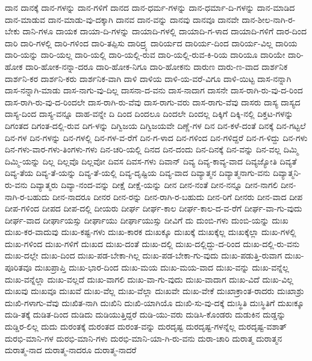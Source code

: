 {ದಾನ
ದಾನಕ್ಕೆ
ದಾನ-ಗಳನ್ನು
ದಾನ-ಗಳಿಗೆ
ದಾನದ
ದಾನ-ಧರ್ಮ-ಗಳನ್ನು
ದಾನ-ಧರ್ಮಾ-ದಿ-ಗಳನ್ನು
ದಾನ-ಮಾಡಿದ
ದಾನ-ಮಾಡುವ
ದಾನ-ಮಾಡು-ವು-ದಕ್ಕಾಗಿ
ದಾನವ
ದಾನ-ವನ್ನು
ದಾನವು
ದಾನವೂ
ದಾನವೇ
ದಾನ-ಶೀಲ-ನಾಗಿ-ರ-ಬೇಕು
ದಾನಿ-ಗಳೂ
ದಾಯಕ
ದಾಯಾ-ದಿ-ಗಳನ್ನು
ದಾಯಾದಿ-ಗಳಲ್ಲಿ
ದಾಯಾದಿ-ಗ-ಳಾದ
ದಾಯಾದಿ-ಗಳಿಗೆ
ದಾರ-ದಿಂದ
ದಾರಿ
ದಾರಿ-ಗಳಲ್ಲಿ
ದಾರಿ-ಗಳಿಂದ
ದಾರಿ-ತಪ್ಪಿಸು
ದಾರಿದ್ರ್ಯ
ದಾರಿರ್ಯದ
ದಾರಿರ್ಯ-ದಿಂದ
ದಾರಿರ್ಯ-ವಿಲ್ಲ
ದಾರಿಯ
ದಾರಿ-ಯನ್ನು
ದಾರಿ-ಯಲ್ಲ
ದಾರಿ-ಯಲ್ಲಿ
ದಾರಿ-ಯಲ್ಲಿ-ರುವ
ದಾರಿ-ಯಲ್ಲಿ-ರುವ-ಕಿ-ರಿಯ
ದಾರಿಯೂ
ದಾರಿಯೇ
ದಾರಿ-ಹೋಕ
ದಾರಿ-ಹೋಕ-ನನ್ನಾ-ದರೂ
ದಾರಿ-ಹೋಕ-ನಿಗೂ
ದಾರಿ-ಹೋಕನು
ದಾರುಣ
ದಾರು-ಣ-ವಾದ
ದಾರ್ಶನಿಕ
ದಾರ್ಶನಿ-ಕರ
ದಾರ್ಶನಿ-ಕರು
ದಾರ್ಶನಿಕ-ವಾಗಿ
ದಾಳಿ
ದಾಳಿಯ
ದಾಳಿ-ಯ-ವರೆ-ವಿಗೂ
ದಾಳಿ-ಯಿಟ್ಟ
ದಾಸ-ನನ್ನಾಗಿ
ದಾಸ-ನನ್ನಾಗಿ-ಮಾಡು
ದಾಸ-ನಾಗು-ವು-ದಿಲ್ಲ
ದಾಸನಾ-ದ-ವನು
ದಾಸ-ನಾದಾಗ
ದಾಸನೇ
ದಾಸ-ರಾಗಿ-ರು-ವು-ದ-ರಿಂದ
ದಾಸ-ರಾಗಿ-ರು-ವು-ದ-ರಿಂದಲೇ
ದಾಸ-ರಾಗಿ-ರು-ವೆವು
ದಾಸ-ರಾಗು-ವರು
ದಾಸ-ರಾಗು-ವೆವು
ದಾಸರು
ದಾಸ್ಯ
ದಾಸ್ಯದ
ದಾಸ್ಯ-ದಿಂದ
ದಾಸ್ಯ-ವನ್ನೂ
ದಾಹ-ವನ್ನೇ
ದಿ
ದಿಂದ
ದಿಂದಲೂ
ದಿಂದಲೇ
ದಿಂದಲ್ಲ
ದಿಕ್ಕಿಗೆ
ದಿಕ್ಕಿ-ನಲ್ಲಿ
ದಿಕ್ತಟ-ಗಳನ್ನು
ದಿಗಂತದ
ದಿಗಂತ-ದಲ್ಲಿ-ರುವ
ದಿಗ-ಳನ್ನು
ದಿಗ್ವಿಜಯ
ದಿಗ್ವಿಜಯವೇ
ದಿಣ್ಣೆ-ಗಳ
ದಿನ
ದಿನ-ಕಳೆ-ದಂತೆ
ದಿನಕ್ಕೆ
ದಿನ-ಗಟ್ಟಲೆ
ದಿನ-ಗಳ
ದಿನ-ಗಳನ್ನು
ದಿನ-ಗಳಲ್ಲಿ
ದಿನ-ಗಳ-ವ-ರೆಗೆ
ದಿನ-ಗ-ಳಾದ
ದಿನ-ಗಳಿಂದ
ದಿನ-ಗಳಿದ್ದರೆ
ದಿನ-ಗ-ಳಿದ್ದು
ದಿನ-ಗಳು
ದಿನ-ಗಳು-ವಾರ-ಗಳು-ತಿಂಗಳು-ಗಳು
ದಿನ-ಚರಿ-ಯಲ್ಲಿ
ದಿನದ
ದಿನ-ದಂದು
ದಿನ-ದಿನಕ್ಕೆ
ದಿನ-ವನ್ನು
ದಿನ-ವಲ್ಲ
ದಿಮ್ಮಿ
ದಿಮ್ಮಿ-ಯನ್ನು
ದಿಲ್ಲ
ದಿಲ್ಲವೊ
ದಿಲ್ಲವೋ
ದಿವಸ
ದಿವಸ-ಗಳು
ದಿವಾನ್
ದಿವ್ಯ
ದಿವ್ಯ-ಕಾವ್ಯ-ವಾದ
ದಿವ್ಯಜ್ಯೋತಿ
ದಿವ್ಯತೆ
ದಿವ್ಯ-ತೆಯ
ದಿವ್ಯ-ತೆ-ಯನ್ನು
ದಿವ್ಯ-ತೆ-ಯಲ್ಲಿ
ದಿವ್ಯ-ದೃಷ್ಟಿಯ
ದಿವ್ಯ-ವಾದ
ದಿವ್ಯಾತ್ಮನ
ದಿವ್ಯಾತ್ಮನಾಗು-ವನು
ದಿವ್ಯಾತ್ಮನಿ-ರು-ವನು
ದಿವ್ಯಾತ್ಮರು
ದಿವ್ಯಾ-ನಂದ-ವನ್ನು
ದೀಕ್ಷೆ
ದೀಕ್ಷೆ-ಯನ್ನು
ದೀನ
ದೀನ-ನಂತೆ
ದೀನ-ನನ್ನೂ
ದೀನ-ನಾಗಲಿ
ದೀನ-ನಾಗಿ-ರ-ಬಹುದು
ದೀನ-ನಾದರೂ
ದೀನರ
ದೀನ-ರನ್ನು
ದೀನ-ರಾಗಿ-ರ-ಬಹುದು
ದೀನ-ರಿಗೆ
ದೀನರು
ದೀನ-ವಾದ
ದೀಪ
ದೀಪ-ಗಳಿಂದ
ದೀಪದ
ದೀಪ-ದಲ್ಲಿ
ದೀಯರು
ದೀರ್ಘ
ದೀರ್ಘ-ಕಾಲ
ದೀರ್ಘ-ಕಾಲ-ದ-ವ-ರೆಗೆ
ದೀರ್ಘ-ವಾ-ಗು-ವುದು
ದೀರ್ಘ-ವಾದ
ದೀರ್ಘಾಯಸ್ಸು
ದೀರ್ಘಾಯು
ದೀರ್ಘಾಯುಸ್ಸು
ದೀವಿಗೆ
ದು
ದುಂಬಿ-ಗಳು
ದುಂಬಿ-ಯನ್ನು
ದುಃಖ
ದುಃಖ-ಕರ-ವಾದುವು
ದುಃಖ-ಕಷ್ಟ-ಗಳು
ದುಃಖ-ಕಾರಕ
ದುಃಖಕ್ಕೂ
ದುಃಖಕ್ಕೆ
ದುಃಖಕ್ಕೆಲ್ಲ
ದುಃಖಕ್ಕೆಲ್ಲಾ
ದುಃಖ-ಗಳಲ್ಲಿ
ದುಃಖ-ಗಳಿಂದ
ದುಃಖ-ಗಳಿಗೆ
ದುಃಖದ
ದುಃಖ-ದಂತೆ
ದುಃಖ-ದಲ್ಲಿ
ದುಃಖ-ದಲ್ಲಿದ್ದು-ದ-ರಿಂದ
ದುಃಖ-ದಲ್ಲಿ-ರು-ವನು
ದುಃಖ-ದಲ್ಲೇ
ದುಃಖ-ದಿಂದ
ದುಃಖ-ಪಡ-ಬೇಕಾ-ಗಿಲ್ಲ
ದುಃಖ-ಪಡ-ಬೇಕಾ-ಗು-ವುದು
ದುಃಖ-ಪಡುತ್ತಿ-ರುವಾಗ
ದುಃಖ-ಪೂರಿತವೂ
ದುಃಖಪ್ರಾಪ್ತಿ
ದುಃಖ-ಭಾರ-ದಿಂದ
ದುಃಖ-ಮಯ
ದುಃಖ-ಮಯ-ವಾದ
ದುಃಖ-ವನ್ನು
ದುಃಖ-ವನ್ನೆಲ್ಲ
ದುಃಖ-ವನ್ನೆಲ್ಲಾ
ದುಃಖ-ವಲ್ಲದೆ
ದುಃಖ-ವಾಗಲಿ
ದುಃಖ-ವಾ-ಗು-ವುದು
ದುಃಖ-ವಾದಾಗ
ದುಃಖ-ವಿದೆ
ದುಃಖ-ವಿಲ್ಲ
ದುಃಖವು
ದುಃಖವೂ
ದುಃಖವೆ
ದುಃಖ-ವೆಲ್ಲ
ದುಃಖ-ವೆಲ್ಲಾ
ದುಃಖವೇ
ದುಃಖ-ವೇಕೆ
ದುಃಖಾಕ್ರಾಂತ-ರಾದರು
ದುಃಖಾಶ್ರು
ದುಃಖಿ-ಗಳಾಗು-ವೆವು
ದುಃಖಿತ-ನಾಗಿ
ದುಃಖಿನಿ
ದುಃಖಿ-ಯಾಗಿಯೊ
ದುಃಖಿ-ಸು-ವು-ದಕ್ಕೆ
ದುಃಸ್ಥಿತಿ
ದುಃಸ್ಥಿತಿಗೆ
ದುಖಃಕ್ಕೂ
ದುಡಿ-ತಕ್ಕೆ
ದುಡಿತ-ದಿಂದ
ದುಡಿದು
ದುಡಿಯುತ್ತಿದ್ದರೆ
ದುಡಿ-ಯು-ವರು
ದುಡಿಸಿ-ಕೊಂಡರು
ದುಡುಕಿನ
ದುಡ್ಡನ್ನು
ದುಡ್ಡಿರ-ಲಿಲ್ಲ
ದುದು
ದುರಂತಕ್ಕೆ
ದುರಂತದ
ದುರಂತ-ವನ್ನು
ದುರದೃಷ್ಟ
ದುರದೃಷ್ಟ-ಗಳನ್ನೆಲ್ಲ
ದುರದೃಷ್ಟ-ವಶಾತ್
ದುರಭಿ-ಮಾನಿ-ಗಳ
ದುರಭಿ-ಮಾನಿ-ಗಳು
ದುರಭಿ-ಮಾನಿ-ಯಾ-ಗಿ-ರು-ವನು
ದುರಾ-ಚಾರಿ
ದುರಾತ್ಮ
ದುರಾತ್ಮನ
ದುರಾತ್ಮ-ನಾದ
ದುರಾತ್ಮ-ನಾದರೂ
ದುರಾತ್ಮ-ನಾದರೆ
}
